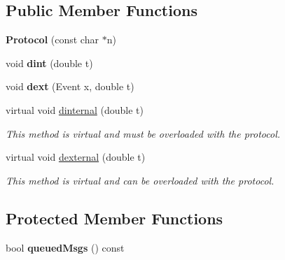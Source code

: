 \subsection*{Public Member Functions}
\begin{DoxyCompactItemize}
\item 
{\bfseries Protocol} (const char $\ast$n)\hypertarget{classProtocol_aafd920db1bcaa6be4c2c1e72381b5cc8}{}\label{classProtocol_aafd920db1bcaa6be4c2c1e72381b5cc8}

\item 
void {\bfseries dint} (double t)\hypertarget{classProtocol_a027f1f8df37abc17e092ec0cd582c377}{}\label{classProtocol_a027f1f8df37abc17e092ec0cd582c377}

\item 
void {\bfseries dext} (Event x, double t)\hypertarget{classProtocol_acb3cc268567fc8265e13f3b13d020ffb}{}\label{classProtocol_acb3cc268567fc8265e13f3b13d020ffb}

\item 
virtual void \hyperlink{classProtocol_a9c6247fa4ea8524d1214fca4cacbd781}{dinternal} (double t)
\begin{DoxyCompactList}\small\item\em This method is virtual and must be overloaded with the protocol. \end{DoxyCompactList}\item 
virtual void \hyperlink{classProtocol_a9995a053fa35d5cd45f609958c6529b2}{dexternal} (double t)
\begin{DoxyCompactList}\small\item\em This method is virtual and can be overloaded with the protocol. \end{DoxyCompactList}\end{DoxyCompactItemize}
\subsection*{Protected Member Functions}
\begin{DoxyCompactItemize}
\item 
bool {\bfseries queued\+Msgs} () const \hypertarget{classProtocol_a8330a7c4bd1b21b594ac38b453549e7d}{}\label{classProtocol_a8330a7c4bd1b21b594ac38b453549e7d}

\end{DoxyCompactItemize}
